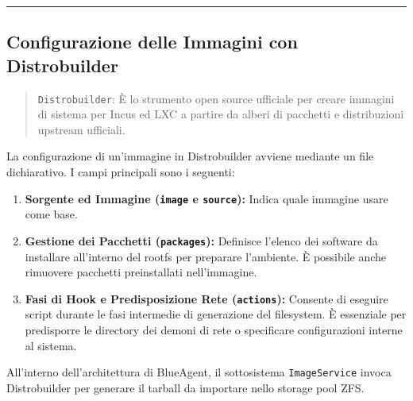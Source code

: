 \begin{center}\rule{0.5\linewidth}{0.5pt}\end{center}

\subsection{Configurazione delle Immagini con
Distrobuilder}\label{configurazione-delle-immagini-con-distrobuilder}

\begin{quote}
\passthrough{\lstinline!Distrobuilder!}: È lo strumento open source
ufficiale per creare immagini di sistema per Incus ed LXC a partire da
alberi di pacchetti e distribuzioni upstream ufficiali.
\end{quote}

La configurazione di un'immagine in Distrobuilder avviene mediante un
file dichiarativo. I campi principali sono i seguenti:

\begin{enumerate}
\def\labelenumi{\arabic{enumi}.}
\item
  \textbf{Sorgente ed Immagine (\passthrough{\lstinline!image!} e
  \passthrough{\lstinline!source!}):} Indica quale immagine usare come
  base.
\item
  \textbf{Gestione dei Pacchetti (\passthrough{\lstinline!packages!}):}
  Definisce l'elenco dei software da installare all'interno del rootfs
  per preparare l'ambiente. È possibile anche rimuovere pacchetti
  preinstallati nell'immagine.
\item
  \textbf{Fasi di Hook e Predisposizione Rete
  (\passthrough{\lstinline!actions!}):} Consente di eseguire script
  durante le fasi intermedie di generazione del filesystem. È essenziale
  per predisporre le directory dei demoni di rete o specificare
  configurazioni interne al sistema.
\end{enumerate}

All'interno dell'architettura di BlueAgent, il sottosistema
\passthrough{\lstinline!ImageService!} invoca Distrobuilder per generare
il tarball da importare nello storage pool ZFS.
